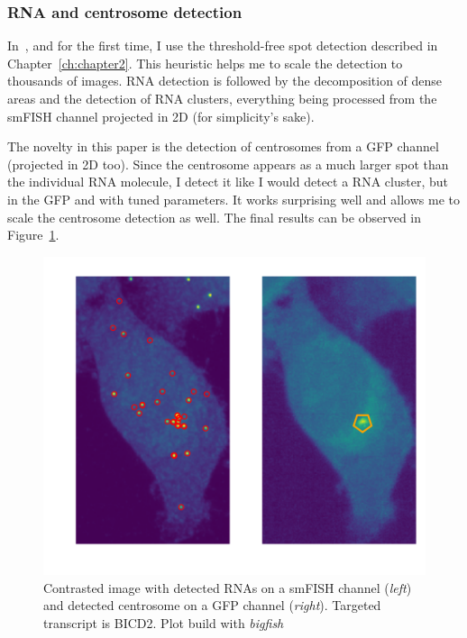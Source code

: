 \subsubsection{RNA and centrosome detection}

In~\cite{safieddine_choreography_2021}, and for the first time, I use the threshold-free spot detection described in Chapter~\ref{ch:chapter2}.
This heuristic helps me to scale the detection to thousands of images.
\ac{RNA} detection is followed by the decomposition of dense areas and the detection of \ac{RNA} clusters, everything being processed from the \ac{smFISH} channel projected in 2D (for simplicity's sake).

The novelty in this paper is the detection of centrosomes from a \ac{GFP} channel (projected in 2D too).
Since the centrosome appears as a much larger spot than the individual \ac{RNA} molecule, I detect it like I would detect a \ac{RNA} cluster, but in the \ac{GFP} and with tuned parameters.
It works surprising well and allows me to scale the centrosome detection as well.
The final results can be observed in Figure~\ref{fig:centrosomes}.

\begin{figure}[]
    \centering
    \includegraphics[width=\textwidth]{figures/chapter5/centrosomes}
    \caption{Contrasted image with detected RNAs on a smFISH channel (\textit{left}) and detected centrosome on a GFP channel (\textit{right}).
	Targeted transcript is BICD2.
	Plot build with \emph{bigfish}}
    \label{fig:centrosomes}
\end{figure}

